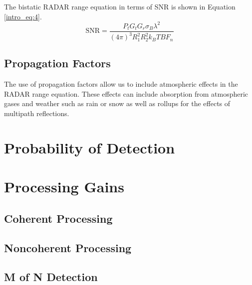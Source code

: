 The bistatic RADAR range equation in terms of SNR is shown in Equation \ref{intro_eq:4}.
\begin{equation}
    \label{intro_eq:4}
\text{SNR} = \frac{P_tG_tG_r\sigma_B\lambda^2}{\left(4\pi\right)^3 R_1^2R_2^2k_BTBF_n}
\end{equation}

\subsection{Propagation Factors}
The use of propagation factors allow us to include atmospheric effects in the RADAR range equation. These effects can include absorption from atmospheric gases and weather such as rain or snow as well as rollups for the effects of multipath reflections.

\section{Probability of Detection}

\section{Processing Gains}
\subsection{Coherent Processing}
\subsection{Noncoherent Processing}
\subsection{M of N Detection}